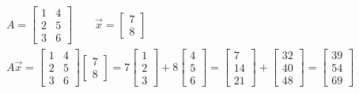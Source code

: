 \begin{eks}
\begin{align*}
A=
\begin{bmatrix}
1 & 4\\
2 & 5\\
3 & 6
\end{bmatrix}
\qquad
\vec{x}=
\begin{bmatrix}
7\\
8
\end{bmatrix} \\
A\vec{x}= \begin{bmatrix}
1 & 4\\
2 & 5\\
3 & 6
\end{bmatrix}
\begin{bmatrix}
7\\
8
\end{bmatrix}
=
7
\begin{bmatrix}
1\\
2\\
3
\end{bmatrix}
+ 8
\begin{bmatrix}
4\\
5\\
6
\end{bmatrix}=
\begin{bmatrix}
7\\
14\\
21
\end{bmatrix}
+
\begin{bmatrix}
32\\
40\\
48
\end{bmatrix}
=
\begin{bmatrix}
39\\
54\\
69
\end{bmatrix}
\end{align*}
\end{eks}
